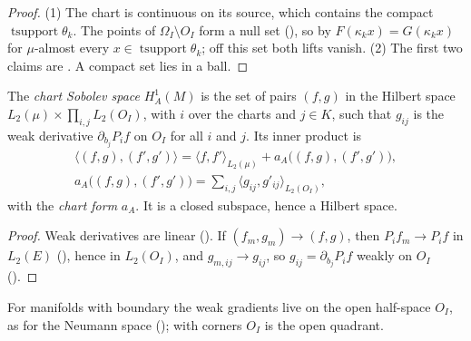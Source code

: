 \begin{proof}
\leanok
(1) The chart is continuous on its source, which contains the compact
$\operatorname{tsupport} \theta_k$. The points of $\Omega_I \setminus O_I$ form a null set
(), so by  $F(\kappa_k x) = G(\kappa_k x)$ for
$\mu$-almost every $x \in \operatorname{tsupport} \theta_k$; off this set both lifts vanish.
(2) The first two claims are . A compact set lies in a ball.
\end{proof}

\begin{definition}
\label{def:chart-sobolev}
\leanok
{}
The \emph{chart Sobolev space} $H^1_A(M)$ is the set of pairs $(f, g)$ in the Hilbert space
$L_2(\mu) \times \prod_{i, j} L_2(O_I)$, with $i$ over the charts and $j \in K$, such that
$g_{ij}$ is the weak derivative $\partial_{b_j} P_i f$ on $O_I$ for all $i$ and $j$. Its inner
product is
\begin{gather*}
  \langle (f, g), (f', g') \rangle = \langle f, f' \rangle_{L_2(\mu)}
    + a_A\bigl((f, g), (f', g')\bigr), \\
  a_A\bigl((f, g), (f', g')\bigr) = \sum_{i, j} \langle g_{ij}, g'_{ij} \rangle_{L_2(O_I)},
\end{gather*}
with the \emph{chart form} $a_A$. It is a closed subspace, hence a Hilbert space.
\end{definition}

\begin{proof}
\leanok
Weak derivatives are linear (). If $(f_m, g_m) \to (f, g)$, then
$P_i f_m \to P_i f$ in $L_2(E)$ (), hence in $L_2(O_I)$, and
$g_{m,ij} \to g_{ij}$, so $g_{ij} = \partial_{b_j} P_i f$ weakly on $O_I$
().
\end{proof}

For manifolds with boundary the weak gradients live on the open half-space $O_I$, as for the
Neumann space (); with corners $O_I$ is the open quadrant.


